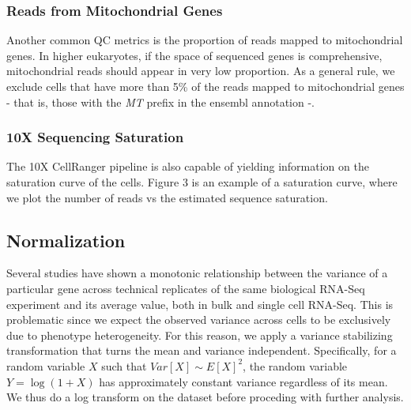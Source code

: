 

\subsubsection{Reads from Mitochondrial Genes}
Another common QC metrics is the proportion of reads mapped to mitochondrial genes. In higher eukaryotes, if the space of sequenced genes is comprehensive, mitochondrial reads should appear in very low proportion. As a general rule, we exclude cells that have more than 5\% of the reads mapped to mitochondrial genes - that is, those with the \emph{MT} prefix in the ensembl annotation -.


\subsubsection{10X Sequencing Saturation}
The 10X CellRanger pipeline is also capable of yielding information on the saturation curve of the cells. Figure 3 is an example of a saturation curve, where  we plot the number of reads vs the estimated sequence saturation. 

\newpage
\subsection{Normalization}
Several studies have shown a monotonic relationship between the variance of a particular gene across technical replicates of the same biological RNA-Seq experiment and its average value, both in bulk \cite{} and single cell RNA-Seq\cite{}. This is problematic since we expect the observed variance across cells to be exclusively due to phenotype heterogeneity. For this reason, we apply a variance stabilizing transformation that turns the mean and variance independent. Specifically, for a random variable $X$ such that $Var[X] \sim E[X]^2$, the random variable $Y = \log(1+X)$ has approximately constant variance regardless of its mean. We thus do a log transform on the dataset before proceding with further analysis.

